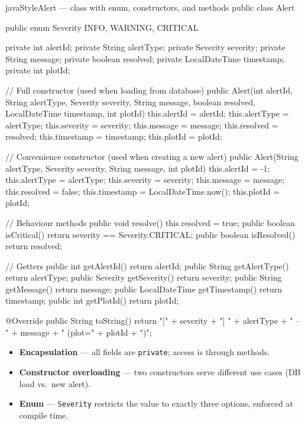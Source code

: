 \documentclass[12pt, a4paper]{report}
\begin{document}
\begin{codeblock}{javaStyle}{Alert --- class with enum, constructors, and methods}
public class Alert {
    public enum Severity { INFO, WARNING, CRITICAL }

    private int           alertId;
    private String        alertType;
    private Severity      severity;
    private String        message;
    private boolean       resolved;
    private LocalDateTime timestamp;
    private int           plotId;

    // Full constructor (used when loading from database)
    public Alert(int alertId, String alertType, Severity severity,
                 String message, boolean resolved,
                 LocalDateTime timestamp, int plotId) {
        this.alertId   = alertId;
        this.alertType = alertType;
        this.severity  = severity;
        this.message   = message;
        this.resolved  = resolved;
        this.timestamp = timestamp;
        this.plotId    = plotId;
    }

    // Convenience constructor (used when creating a new alert)
    public Alert(String alertType, Severity severity,
                 String message, int plotId) {
        this.alertId   = -1;
        this.alertType = alertType;
        this.severity  = severity;
        this.message   = message;
        this.resolved  = false;
        this.timestamp = LocalDateTime.now();
        this.plotId    = plotId;
    }

    // Behaviour methods
    public void    resolve()    { this.resolved = true; }
    public boolean isCritical() { return severity == Severity.CRITICAL; }
    public boolean isResolved() { return resolved; }

    // Getters
    public int           getAlertId()   { return alertId; }
    public String        getAlertType() { return alertType; }
    public Severity      getSeverity()  { return severity; }
    public String        getMessage()   { return message; }
    public LocalDateTime getTimestamp()  { return timestamp; }
    public int           getPlotId()    { return plotId; }

    @Override
    public String toString() {
        return "[" + severity + "] " + alertType
             + " -- " + message + " (plot=" + plotId + ")";
    }
}
\end{codeblock}

\begin{tcolorbox}[notebox, title={Key OOP Concepts}]
\begin{itemize}[noitemsep]
    \item \textbf{Encapsulation} --- all fields are \texttt{private}; access is through methods.
    \item \textbf{Constructor overloading} --- two constructors serve different use cases (DB load vs.\ new alert).
    \item \textbf{Enum} --- \texttt{Severity} restricts the value to exactly three options, enforced at compile time.
\end{itemize}
\end{tcolorbox}
\end{document}
